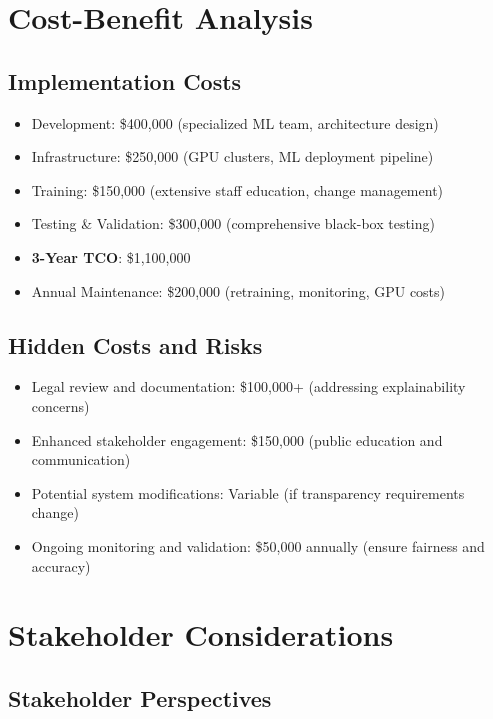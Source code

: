 \section{Cost-Benefit Analysis}

\subsection{Implementation Costs}

\begin{itemize}
    \item Development: \$400,000 (specialized ML team, architecture design)
    \item Infrastructure: \$250,000 (GPU clusters, ML deployment pipeline)
    \item Training: \$150,000 (extensive staff education, change management)
    \item Testing \& Validation: \$300,000 (comprehensive black-box testing)
    \item \textbf{3-Year TCO}: \$1,100,000
    \item Annual Maintenance: \$200,000 (retraining, monitoring, GPU costs)
\end{itemize}

\subsection{Hidden Costs and Risks}

\begin{itemize}
    \item Legal review and documentation: \$100,000+ (addressing explainability concerns)
    \item Enhanced stakeholder engagement: \$150,000 (public education and communication)
    \item Potential system modifications: Variable (if transparency requirements change)
    \item Ongoing monitoring and validation: \$50,000 annually (ensure fairness and accuracy)
\end{itemize}

\section{Stakeholder Considerations}

\subsection{Stakeholder Perspectives}

